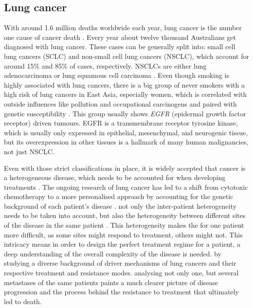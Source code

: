\subsection{Lung cancer}
\label{intro-sec:lungcancer}

With around 1.6 million deaths worldwide each year, lung cancer is the number one cause of cancer death \cite{Siegel2018}. Every year about twelve thousand Australians get diagnosed with lung cancer. These cases can be generally split into: small cell lung cancers (SCLC) and non-small cell lung cancers (NSCLC), which account for around 15\% and 85\% of cases, respectively.  NSCLCs are either lung adenocarcinoma or lung squamous cell carcinoma \cite{Molina2008}. Even though smoking is highly associated with lung cancers, there is a big group of never smokers with a high risk of lung cancers in East Asia, especially women, which is correlated with outside influences like pollution and occupational carcinogens and paired with genetic susceptibility \cite{Sun2007}.
This group usually shows \textit{EGFR} (epidermal growth factor receptor) driven tumours. EGFR is a transmembrane receptor tyrosine kinase, which is usually only expressed in epithelial, mesenchymal, and neurogenic tissue, but its overexpression in other tissues is a hallmark of many human malignancies, not just NSCLC.

Even with those strict classifications in place, it is widely accepted that cancer is a heterogeneous disease, which needs to be accounted for when developing treatments \cite{Suda2018}. The ongoing research of lung cancer has led to a shift from cytotoxic chemotherapy to a more personalised approach by accounting for the genetic background of each patient’s disease \cite{Lindeman2018}. 
 not only the inter-patient heterogeneity needs to be taken into account, but also the heterogeneity between different sites of the disease in the same patient \cite{Leong2018,Savas2016}. This heterogeneity makes the  for one patient more difficult, as some sites might respond to treatment,  others might not. This intricacy means in order to design the perfect treatment regime for a patient, a deep understanding of the overall complexity of the disease is needed.  by studying a diverse background of driver mechanisms of lung cancers and their respective treatment and resistance modes.  analysing not only one, but several metastases of the same patients paints a much clearer picture of disease progression and the process behind the resistance to treatment that ultimately led to death. 


